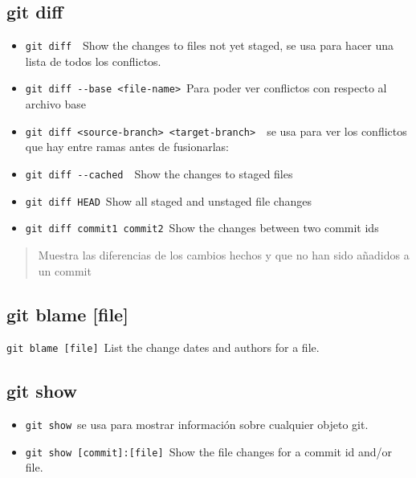 \documentclass[
  a2paper,
]{article}
\begin{document}
\hypertarget{git-diff}{%
\subsection{git diff}\label{git-diff}}

\begin{itemize}
\item
  \texttt{git\ diff}~~Show the changes to files not yet staged, se usa
  para hacer una lista de todos los conflictos.
\item
  \texttt{git\ diff\ -\/-base\ \textless{}file-name\textgreater{}}~Para
  poder ver conflictos con respecto al archivo base
\item
  \texttt{git\ diff\ \textless{}source-branch\textgreater{}\ \textless{}target-branch\textgreater{}}~~se
  usa para ver los conflictos que hay entre ramas antes de fusionarlas:
\item
  \texttt{git\ diff\ -\/-cached}~~Show the changes to staged files
\item
  \texttt{git\ diff\ HEAD}~Show all staged and unstaged file changes
\item
  \texttt{git\ diff\ commit1\ commit2}~Show the changes between two
  commit ids
\end{itemize}

\begin{quote}
Muestra las diferencias de los cambios hechos y que no han sido añadidos
a un commit
\end{quote}

\hypertarget{git-blame-file}{%
\subsection{git blame {[}file{]}}\label{git-blame-file}}

\texttt{git\ blame\ {[}file{]}}~List the change dates and authors for a
file.

\hypertarget{git-show}{%
\subsection{git show}\label{git-show}}

\begin{itemize}
\item
  \texttt{git\ show}~se usa para mostrar información sobre cualquier
  objeto git.
\item
  \texttt{git\ show\ {[}commit{]}:{[}file{]}}~Show the file changes for
  a commit id and/or file.
\end{itemize}
\end{document}
